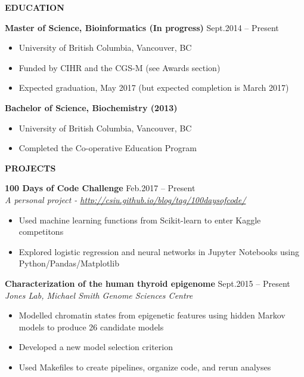 \documentclass{res}
\renewcommand{\section}[1]{%
  \vspace{0.3in}%
  \centerline{\uppercase{\bf{#1}}}%
  \vspace{-6pt}}
\newcommand{\linehead}[2]{%
  {\bf #1} \hfill #2\\}
\newcommand{\linetitle}[1]{%
  {\sl #1}}
\begin{document}
\begin{resume}

\thispagestyle{empty} %

\section{Education}
\linehead{Master of Science, Bioinformatics (In progress)}{Sept.2014 -- Present}\vspace{-8pt}
\begin{itemize}
  \item University of British Columbia, Vancouver, BC
  \item Funded by CIHR and the CGS-M (see Awards section)
  \item Expected graduation, May 2017 (but expected completion is March 2017)
\end{itemize}

\linehead{Bachelor of Science, Biochemistry (2013)}{}\vspace{-8pt}
\begin{itemize}
  \item University of British Columbia, Vancouver, BC
  \item Completed the Co-operative Education Program
\end{itemize}

\section{Projects}
\linehead{100 Days of Code Challenge}{Feb.2017 -- Present}
\linetitle{A personal project - \url{http://csiu.github.io/blog/tag/100daysofcode/}}
\begin{itemize}
  \item Used machine learning functions from Scikit-learn to enter Kaggle competitons
  \item Explored logistic regression and neural networks in Jupyter Notebooks using Python/Pandas/Matplotlib
\end{itemize}

\linehead{Characterization of the human thyroid epigenome}{Sept.2015 -- Present}
\linetitle{Jones Lab, Michael Smith Genome Sciences Centre}
\begin{itemize}
  \item Modelled chromatin states from epigenetic features using hidden Markov models to produce 26 candidate models
  \item Developed a new model selection criterion
  \item Used Makefiles to create pipelines, organize code, and rerun analyses
\end{itemize}


\end{resume}
\end{document}
